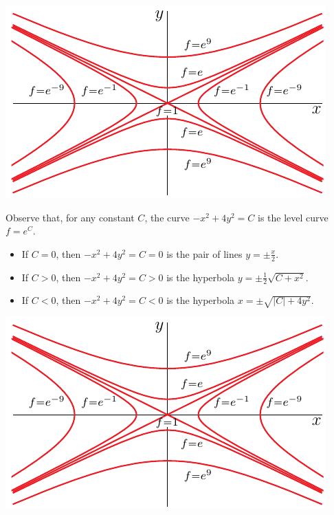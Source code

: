 %

\begin{answer}
\begin{center}
     \includegraphics{fig/OE11D_1.pdf}
\end{center}
\end{answer}

\begin{solution}
 Observe that, for any constant $C$, the curve $-x^2+4y^2=C$
is the level curve $f=e^C$.
\begin{itemize}
\item
If $C=0$, then $-x^2+4y^2=C=0$ is the pair of lines $y=\pm\frac{x}{2}$.
\item
If $C>0$, then $-x^2+4y^2=C>0$ is the hyperbola $y=\pm\frac{1}{2}\sqrt{C+x^2}$. 
\item
If $C<0$, then $-x^2+4y^2=C<0$ is the hyperbola $x=\pm\sqrt{|C|+4y^2}$. 
\end{itemize}

\begin{center}
     \includegraphics{fig/OE11D_1.pdf}
\end{center}

\end{solution}


